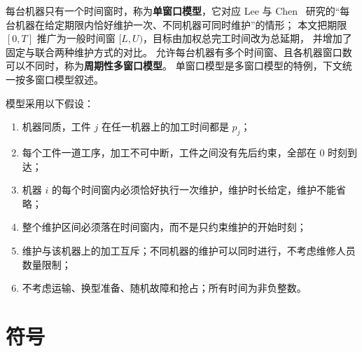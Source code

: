 \documentclass[11pt,oneside,notitlepage]{ctexrep}
\theoremstyle{definition}
\theoremstyle{remark}
\begin{document}
每台机器只有一个时间窗时，称为\textbf{单窗口模型}，它对应 Lee 与 Chen~\cite{lee2000}
研究的“每台机器在给定期限内恰好维护一次、不同机器可同时维护”的情形；
本文把期限 $[0,T]$ 推广为一般时间窗 $[L,U)$，目标由加权总完工时间改为总延期，
并增加了固定与联合两种维护方式的对比。
允许每台机器有多个时间窗、且各机器窗口数可以不同时，称为\textbf{周期性多窗口模型}。
单窗口模型是多窗口模型的特例，下文统一按多窗口模型叙述。

模型采用以下假设：
\begin{enumerate}[label=(A\arabic*),nosep]
  \item 机器同质，工件 $j$ 在任一机器上的加工时间都是 $p_j$；
  \item 每个工件一道工序，加工不可中断，工件之间没有先后约束，全部在 0 时刻到达；
  \item 机器 $i$ 的每个时间窗内必须恰好执行一次维护，维护时长给定，维护不能省略；
  \item 整个维护区间必须落在时间窗内，而不是只约束维护的开始时刻；
  \item 维护与该机器上的加工互斥；不同机器的维护可以同时进行，不考虑维修人员数量限制；
  \item 不考虑运输、换型准备、随机故障和抢占；所有时间为非负整数。
\end{enumerate}

\section{符号}
\end{document}
